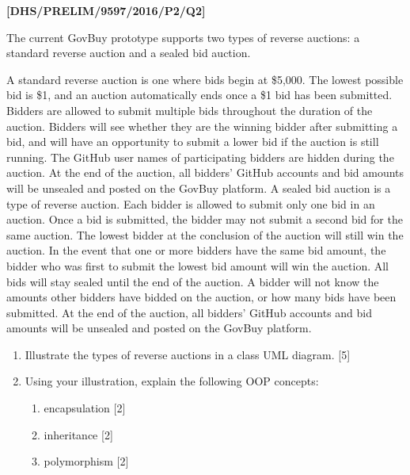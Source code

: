 \item \textbf{{[}DHS/PRELIM/9597/2016/P2/Q2{]} }

The current GovBuy prototype supports two types of reverse auctions:
a standard reverse auction and a sealed bid auction. 

A standard reverse auction is one where bids begin at \$5,000. The
lowest possible bid is \$1, and an auction automatically ends once
a \$1 bid has been submitted. Bidders are allowed to submit multiple
bids throughout the duration of the auction. Bidders will see whether
they are the winning bidder after submitting a bid, and will have
an opportunity to submit a lower bid if the auction is still running.
The GitHub user names of participating bidders are hidden during the
auction. At the end of the auction, all bidders' GitHub accounts and
bid amounts will be unsealed and posted on the GovBuy platform. A
sealed bid auction is a type of reverse auction. Each bidder is allowed
to submit only one bid in an auction. Once a bid is submitted, the
bidder may not submit a second bid for the same auction. The lowest
bidder at the conclusion of the auction will still win the auction.
In the event that one or more bidders have the same bid amount, the
bidder who was first to submit the lowest bid amount will win the
auction. All bids will stay sealed until the end of the auction. A
bidder will not know the amounts other bidders have bidded on the
auction, or how many bids have been submitted. At the end of the auction,
all bidders' GitHub accounts and bid amounts will be unsealed and
posted on the GovBuy platform. 
\begin{enumerate}
\item Illustrate the types of reverse auctions in a class UML diagram. \hfill{}{[}5{]}
\item Using your illustration, explain the following OOP concepts: 
\begin{enumerate}
\item encapsulation \hfill{}{[}2{]}
\item inheritance \hfill{}{[}2{]}
\item polymorphism \hfill{} {[}2{]}
\end{enumerate}
\end{enumerate}